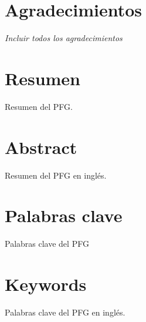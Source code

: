 \documentclass[12pt,twoside]{book}
\newcommand\paginablanco{%
    \null
    \thispagestyle{empty}%
    \newpage}
\begin{document}

\chapter*{Agradecimientos}
\thispagestyle{empty}
\begin{flushright}
\textit{Incluir todos los agradecimientos}
\end{flushright}

\chapter*{Resumen} %

Resumen del PFG.

\chapter*{Abstract} %

Resumen del PFG en inglés.

\chapter*{Palabras clave} %

Palabras clave del PFG

\chapter*{Keywords} %

Palabras clave del PFG en inglés.

\tableofcontents %

\listoftables    %

\listoffigures   %
\newpage

\paginablanco{}

\pagestyle{fancy}








\newpage


\clearpage

\appendix



\end{document}
